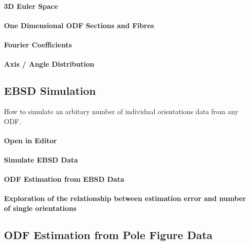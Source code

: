 \documentclass{article}
\begin{document}
			\paragraph{3D Euler Space}
		
			\paragraph{One Dimensional ODF Sections and Fibres}
		
			\paragraph{Fourier Coefficients}
		
			\paragraph{Axis / Angle Distribution}
		
		\subsection{EBSD Simulation}

		
                     \begin{par}
How to simulate an arbitary number of individual orientations data from any ODF.
\end{par} \vspace{1em}

                  
			\paragraph{Open in Editor}
		
			\paragraph{Simulate EBSD Data}
		
			\paragraph{ODF Estimation from EBSD Data}
		
			\paragraph{Exploration of the relationship between estimation error and number of single orientations}
		
		\subsection{ODF Estimation from Pole Figure Data}
\end{document}
